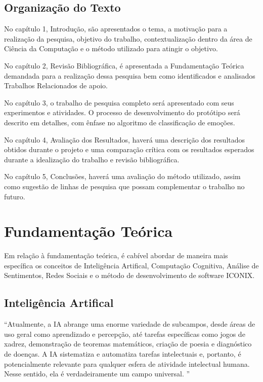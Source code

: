 \documentclass[
	12pt,				%
	openright,			%
	oneside,			%
	a4paper,			%
	english,			%
	spanish,			%
	brazil				%
	]{abntex2}
\begin{document}
	\section{Organização do Texto}
		No capítulo 1, Introdução, são apresentados o tema, a motivação para a realização da pesquisa, objetivo do trabalho, contextualização dentro da área de Ciência da Computação e o método utilizado para atingir o objetivo.
		
		No capítulo 2, Revisão Bibliográfica, é apresentada a Fundamentação Teórica demandada para a realização dessa pesquisa bem como identificados e analisados Trabalhos Relacionados de apoio.
		
		No capítulo 3, o trabalho de pesquisa completo será apresentado com seus experimentos e atividades. O processo de desenvolvimento do protótipo será descrito em detalhes, com ênfase no algoritmo de classificação de emoções. 
		
		No capítulo 4, Avaliação dos Resultados, haverá uma descrição dos resultados obtidos durante o projeto e uma comparação crítica com os resultados esperados durante a idealização do trabalho e revisão bibliográfica. 

		No capítulo 5, Conclusões, haverá uma avaliação do método utilizado, assim como sugestão de linhas de pesquisa que possam complementar o trabalho no futuro.
		
				

\chapter{Fundamentação Teórica}
	
	Em relação à fundamentação teórica, é cabível abordar de maneira mais específica os conceitos de Inteligência Artifical, Computação Cognitiva, Análise de Sentimentos, Redes Sociais e o método de desenvolvimento de software ICONIX.

	\section{Inteligência Artifical}	
	\begin{citacao} “Atualmente, a IA abrange uma enorme variedade de subcampos, desde áreas de uso geral como aprendizado e percepção, até tarefas específicas como jogos de xadrez, demonstração de teoremas matemáticos, criação de poesia e diagnóstico de doenças. A IA sistematiza e automatiza tarefas intelectuais e, portanto, é potencialmente relevante para qualquer esfera de atividade intelectual humana. Nesse sentido, ela é verdadeiramente um campo universal. ” \cite{norvig}
	\end{citacao}
\end{document}
